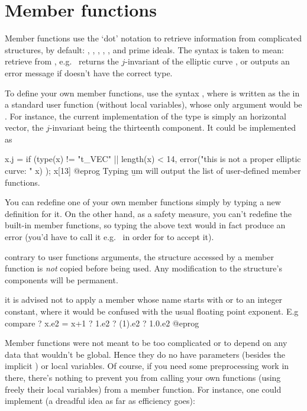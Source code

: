 \section{Member functions} \label{se:member}

Member functions use the `dot' notation to retrieve information from
complicated structures, by default: , , ,
, ,  and prime ideals. The syntax
 is taken to mean: retrieve  from
, e.g.~ returns the $j$-invariant of the elliptic
curve , or outputs an error message if  doesn't have the
correct type.

To define your own member functions, use the syntax , where  is written as the  in a
standard user function (without local variables), whose only argument would
be . For instance, the current implementation of the 
type is simply an horizontal vector, the $j$-invariant being the thirteenth
component. It could be implemented as

\bprog
x.j =
{
  if (type(x) != "t_VEC" || length(x) < 14,
    error("this is not a proper elliptic curve: " x)
  );
  x[13]
}
@eprog\noindent
Typing \b{um} will output the list of user-defined member functions.

You can redefine one of your own member functions simply by typing a new
definition for it. On the other hand, as a safety measure, you can't redefine
the built-in member functions, so typing the above text would in fact produce
an error (you'd have to call it e.g.~ in order for  to
accept it).

 contrary to user functions arguments, the structure
accessed by a member function is \emph{not} copied before being used.
Any modification to the structure's components will be permanent.

 it is advised not to apply a member whose name
starts with  or  to an integer constant, where it would be
confused with the usual floating point exponent. E.g compare
\bprog
  ? x.e2 = x+1
  ? 1.e2
  ? (1).e2
  ? 1.0.e2
@eprog

 Member functions were not meant to be too complicated or to
depend on any data that wouldn't be global. Hence they do no have parameters
(besides the implicit ) or local variables. Of course, if you
need some preprocessing work in there, there's nothing to prevent you from
calling your own functions (using freely their local variables) from a member
function. For instance, one could implement (a dreadful idea as far as
efficiency goes):

